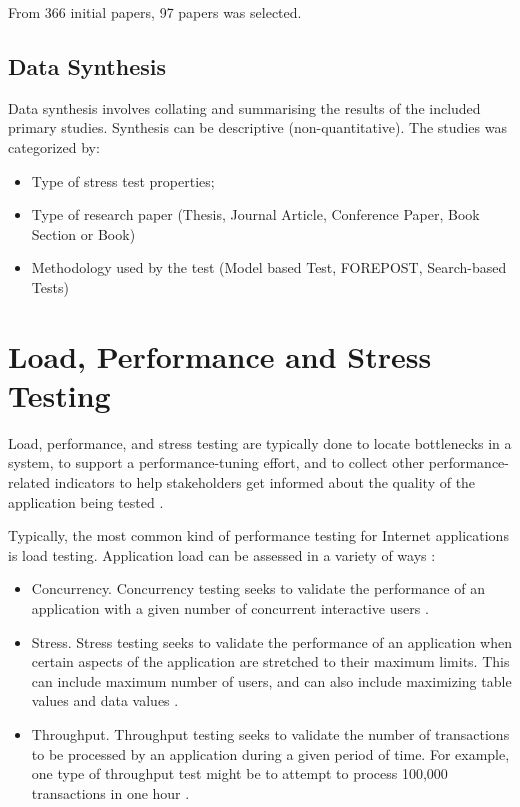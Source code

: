 \documentclass{report}
\begin{document}
From 366 initial papers, 97 papers was selected.

\subsection{Data Synthesis}

Data synthesis involves collating and summarising the results of the included primary studies. Synthesis can be descriptive (non-quantitative).  The studies was categorized by: 

\begin{itemize}
\item Type of stress test properties;
\item Type of research paper (Thesis, Journal Article, Conference Paper, Book Section or Book)  
\item Methodology used by the test (Model based Test, FOREPOST, Search-based Tests)
\end{itemize}

\section{Load, Performance and Stress Testing}

Load, performance, and stress testing are typically done to locate bottlenecks in a system, to support a performance-tuning effort, and to collect other performance-related indicators to help stakeholders get informed about the quality of the application being tested \cite{Sandler2004} \cite{Corporation2007}. 

Typically, the most common kind of performance testing for Internet applications is load testing. Application load can be assessed in a variety of ways \cite{Perry2004}:

\begin{itemize}
\item Concurrency. Concurrency testing seeks to validate the performance of an application with a given number of concurrent interactive users \cite{Perry2004}.
\item Stress. Stress testing seeks to validate the performance of an application when certain aspects of the application are stretched to their maximum limits. This can include maximum number of users, and can also include maximizing table values and data values \cite{Perry2004}.
\item Throughput. Throughput testing seeks to validate the number of transactions to be processed by an application during a given period of time. For example, one type of throughput test might be to attempt to process 100,000 transactions in one hour \cite{Perry2004}.
\end{itemize}
\end{document}
